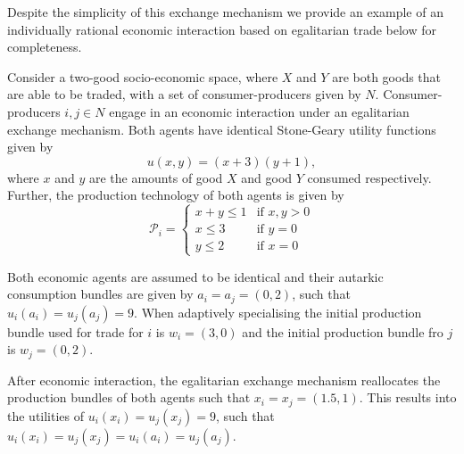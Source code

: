 Despite the simplicity of this exchange mechanism we provide an example of an individually rational economic interaction based on egalitarian trade below for completeness.


\begin{example} \label{ex:egalitarianExchange}
Consider a two-good socio-economic space, where $X$ and $Y$ are both goods that are able to be traded, with a set of consumer-producers given by $N$. Consumer-producers $i,j \in N$ engage in an economic interaction under an egalitarian exchange mechanism. Both agents have identical Stone-Geary utility functions given by
\begin{equation}
u(x,y) = (x + 3) (y + 1) ,
\end{equation}
where $x$ and $y$ are the amounts of good $X$ and good $Y$ consumed respectively. Further, the production technology of both agents is given by
\begin{equation}
\mathcal{P}_{i} = \left\{ \begin{array}{ll}
         x + y \leqslant 1 & \mbox{if $x,y > 0$}\\
		 x \leqslant 3 & \mbox{if $y = 0$}\\
         y \leqslant 2 & \mbox{if $x = 0$}\end{array} \right.
\end{equation}

Both economic agents are assumed to be identical and their autarkic consumption bundles are given by $a_{i} = a_{j} = (0, 2)$, such that $u_{i}(a_{i}) = u_{j}(a_{j}) = 9$. When adaptively specialising the initial production bundle used for trade for $i$ is $w_{i} = (3, 0)$ and the initial production bundle fro $j$ is $w_{j} = (0, 2)$.

After economic interaction, the egalitarian exchange mechanism reallocates the production bundles of both agents such that $x_{i} = x_{j} = (1.5, 1)$. This results into the utilities of $u_{i}(x_{i}) = u_{j}(x_{j}) = 9$, such that $u_{i}(x_{i}) = u_{j}(x_{j}) = u_{i}(a_{i}) = u_{j}(a_{j})$.
\end{example}

